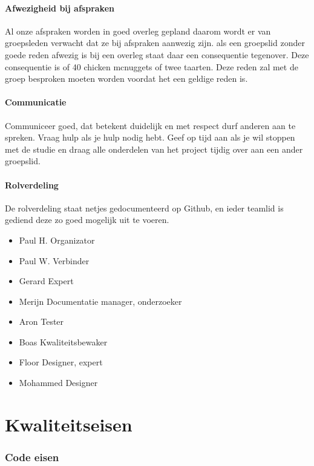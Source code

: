 \documentclass{article}
\begin{document}
\paragraph{Afwezigheid bij afspraken}

Al onze afspraken worden in goed overleg gepland daarom wordt er van groepsleden verwacht
dat ze bij afspraken aanwezig zijn. als een groepslid zonder goede reden afwezig is bij een
overleg staat daar een consequentie tegenover. Deze consequentie is of 40 chicken mcnuggets
of twee taarten. Deze reden zal met de groep besproken moeten worden voordat het een geldige reden is.

\paragraph{Communicatie}

Communiceer goed, dat betekent duidelijk en met respect durf anderen aan te spreken.
Vraag hulp als je hulp nodig hebt.
Geef op tijd aan als je wil stoppen met de studie en draag alle onderdelen van het project tijdig
over aan een ander groepslid.

\paragraph{Rolverdeling}

De rolverdeling staat netjes gedocumenteerd op Github, en ieder teamlid is gediend deze zo
goed mogelijk uit te voeren.
\begin{itemize}
\item Paul H. Organizator
\item Paul W. Verbinder
\item Gerard Expert
\item Merijn Documentatie manager, onderzoeker
\item Aron Tester
\item Boas Kwaliteitsbewaker
\item Floor Designer, expert
\item Mohammed Designer
\end{itemize}

\newpage

\section{Kwaliteitseisen}


\subsubsection{Code eisen}
\end{document}

